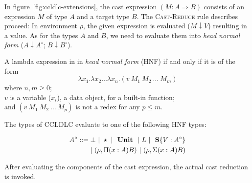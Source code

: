 In figure~\ref{fig:ccldlc-extensions}, the cast expression $(M : A \Rightarrow B)$ consists of an expression $M$ of type $A$ and a target type $B$. The \textsc{Cast-Reduce} rule describes proceed: In environment $\rho$, the given expression is evaluated ($M \downarrow V$) resulting in a value. As for the types $A$ and $B$, we need to evaluate them into \emph{head normal form} ($A \downarrow A^\circ$; $B \downarrow B^\circ$).

\renewcommand{\mkcitation}[1]{\\--- #1}
\begin{displayquote}
A lambda expression in in \emph{head normal form} (HNF) if and only if it is of the form
\begin{equation*}
\lambda x_1 . \lambda x_2 \dots \lambda x_n . (v~M_1~M_2~\dots~M_m)
\end{equation*}
where $n, m \geq 0$; \\
\hspace*{11mm}$v$ is a variable ($x_i$), a data object, for a built-in function; \\
and \hspace*{2mm} $(v~M_1~M_2~\dots~M_p)$ is not a redex for any $p \leq m$.
\end{displayquote}

The types of CCLDLC evaluate to one of the following HNF types:

\begin{equation}
\begin{split}
 A^\circ ::= \bot ~|~ \star ~|~ \text{ \textbf{Unit} } ~|~ L ~|~ \text{ \textbf{S}}\{V:A^\circ\} \\
 |~ (\rho, \Pi(x:A)B) ~|~ (\rho, \Sigma(x:A)B)
\end{split}
 \end{equation}


After evaluating the components of the cast expression, the actual cast reduction is invoked.
